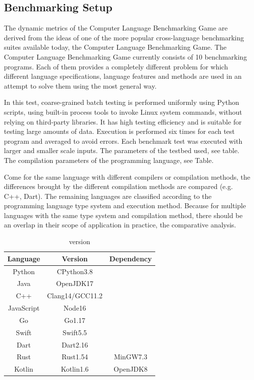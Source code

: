 \subsection{Benchmarking Setup}

The dynamic metrics of the Computer Language Benchmarking Game are derived from the ideas of one of the more popular cross-language benchmarking suites available today, the Computer Language Benchmarking Game. The Computer Language Benchmarking Game currently consists of 10 benchmarking programs. Each of them provides a completely different problem for which different language specifications, language features and methods are used in an attempt to solve them using the most general way.

In this test, coarse-grained batch testing is performed uniformly using Python scripts, using built-in process tools to invoke Linux system commands, without relying on third-party libraries. It has high testing efficiency and is suitable for testing large amounts of data. Execution is performed six times for each test program and averaged to avoid errors. Each benchmark test was executed with larger and smaller scale inputs. The parameters of the testbed used, see table. The compilation parameters of the programming language, see Table.

Come for the same language with different compilers or compilation methods, the differences brought by the different compilation methods are compared (e.g. C++, Dart). The remaining languages are classified according to the programming language type system and execution method. Because for multiple languages with the same type system and compilation method, there should be an overlap in their scope of application in practice, the comparative analysis.


\begin{table}[ht]
    \caption{version}
    \label{tab:version}
    \begin{center}
        \begin{tabular}{ccc}
            \toprule
            Language   & Version         & Dependency \\
            \midrule
            Python     & CPython3.8      &            \\
            Java       & OpenJDK17       &            \\
            C++        & Clang14/GCC11.2 &            \\
            JavaScript & Node16          &            \\
            Go         & Go1.17          &            \\
            Swift      & Swift5.5        &            \\
            Dart       & Dart2.16        &            \\
            Rust       & Rust1.54        & MinGW7.3   \\
            Kotlin     & Kotlin1.6       & OpenJDK8   \\
            \bottomrule
        \end{tabular}
    \end{center}
\end{table}


